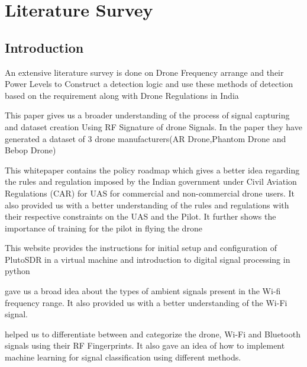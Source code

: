 \chapter{Literature Survey} \label{Literature Survey}
\section{Introduction} \label{Introduction}
An extensive literature survey is done on Drone Frequency arrange and their Power Levels to Construct a detection logic and use these methods of detection based on the requirement along with Drone Regulations in India


This paper \cite{1} gives us a broader understanding of the process of signal capturing and dataset creation Using RF Signature of drone Signals. In the paper they have generated a dataset of 3 drone manufacturers(AR Drone,Phantom Drone and Bebop Drone)


This whitepaper \cite{2} contains the policy roadmap  which gives a better idea regarding  the rules and regulation imposed by the Indian government under Civil Aviation Regulations (CAR) for UAS for commercial and non-commercial drone users.  It also provided us with a better understanding of the  rules and regulations with their respective constraints on the UAS and the Pilot. It further shows the importance of training for the pilot in flying the drone


This website \cite{4} provides the instructions for initial setup and configuration of PlutoSDR in a virtual machine and introduction to digital signal processing in python

\cite{5} gave us a broad idea about the types of ambient signals present in the Wi-fi frequency range. It also provided us with a better understanding of the Wi-Fi signal.

\cite{6} helped us to differentiate between and categorize the drone, Wi-Fi and Bluetooth signals using their RF Fingerprints. It also gave an idea of how to implement machine learning for signal classification using different methods.


